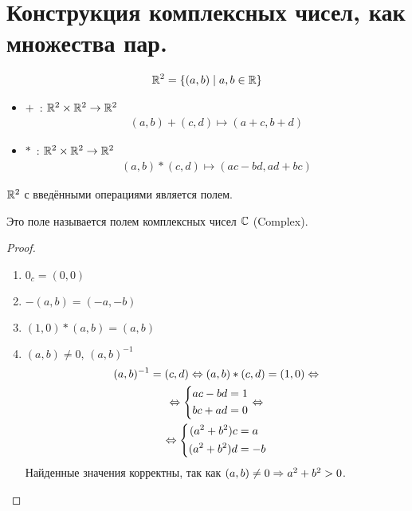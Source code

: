 \section{Конструкция комплексных чисел, как множества пар.}
\begin{gather*}
\mathbb{R}^2 = \{(a, b) \mid a, b \in \mathbb{R}\}
\end{gather*}
\begin{itemize} 
\item $+$~: $\mathbb{R}^2 \times \mathbb{R}^2 \rightarrow \mathbb{R}^2$
\begin{gather*}
(a, b) + (c, d) \mapsto (a + c, b + d)
\end{gather*}
\item $*$~: $\mathbb{R}^2 \times \mathbb{R}^2 \rightarrow \mathbb{R}^2$
\begin{gather*}
(a, b)*(c, d) \mapsto (ac - bd, ad + bc)
\end{gather*}
\end{itemize}
\begin{theorem}{}
$\mathbb{R}^2$ с введёнными операциями является полем.
\end{theorem}
\begin{Def}
Это поле называется полем комплексных чисел $\mathbb{C}$ (Complex).
\end{Def}
\begin{proof}
\begin{enumerate}
\item $0_c = (0, 0)$
\item $-(a, b) = (-a, -b) $
\item $(1, 0) * (a, b) = (a, b) $
\item$ (a, b) \ne 0$, $(a, b)^{-1}$
\begin{gather*}
(a, b)^{-1} = (c, d) \Leftrightarrow (a, b)*(c, d) = (1, 0) \Leftrightarrow \\
\Leftrightarrow \left\{\begin{aligned}
ac - bd &= 1 \\
bc + ad &= 0 \\
\end{aligned}\right.\Leftrightarrow \\
\Leftrightarrow \left\{\begin{aligned}
(a^2 + b^2) c &= a \\
(a^2 + b^2) d &= -b
\end{aligned}\right.
\end{gather*}
Найденные значения корректны, так как $(a, b) \ne 0 \Rightarrow a^2 + b^2 > 0$.
\end{enumerate}
\end{proof}
